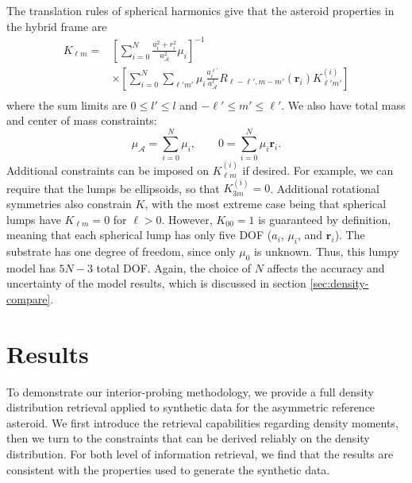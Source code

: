 \documentclass[fleqn,usenatbib]{mnras}
\newcommand{\brackets}[1]{\left[ #1 \right]}
\begin{document}
The translation rules of spherical harmonics give that the asteroid properties in the hybrid frame are
\begin{equation}
  \begin{aligned}
    K_{\ell m} = &\brackets{\sum_{i=0}^N \frac{a_i^2 + r_i^2}
    {a_\mathcal{A}^2}\mu_i}^{-1} \\
    &\times \brackets{\sum_{i=0}^N \sum_{\ell' m'}\mu_i
    \frac{a_i^{\ell'}}{a_\mathcal{A}^\ell}
    R_{\ell - \ell', m - m'}(\bm r_i)K_{\ell' m'}^{(i)}} \\
  \end{aligned}
\end{equation}
where the sum limits are $0 \leq l' \leq l$ and $-\ell' \leq m' \leq \ell'$. We also have total mass and center of mass constraints:
\begin{equation}
  \mu_\mathcal{A} = \sum_{i=0}^N \mu_i,  \qquad 0 = \sum_{i=0}^N \mu_i \bm r_i.
\end{equation}
Additional constraints can be imposed on $K_{\ell m}^{(i)}$ if desired. For example, we can require that the lumps be ellipsoids, so that $K_{3 m}^{(i)} = 0$. Additional rotational symmetries also constrain $K$, with the most extreme case being that spherical lumps have $K_{\ell m} = 0$ for $\ell > 0$. However, $K_{00}=1$ is guaranteed by definition, meaning that each spherical lump has only five DOF ($a_i$, $\mu_i$, and $\bm r_i$). The substrate has one degree of freedom, since only $\mu_0$ is unknown. Thus, this lumpy model has $5N - 3$ total DOF. Again, the choice of $N$ affects the accuracy and uncertainty of the model results, which is discussed in section \ref{sec:density-compare}.



\section{Results}
\label{sec:results}

To demonstrate our interior-probing methodology, we provide a full density distribution retrieval applied to synthetic data for the asymmetric reference asteroid. We first introduce the retrieval capabilities regarding density moments, then we turn to the constraints that can be derived reliably on the density distribution. For both level of information retrieval, we find that the results are consistent with the properties used to generate the synthetic data.
\end{document}
